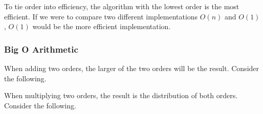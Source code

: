 To tie order into efficiency, the algorithm with the lowest order is the most efficient. If we were to compare two different implementations $O(n)$ and $O(1)$, $O(1)$ would be the more efficient implementation.\\

\subsubsection*{Big O Arithmetic}

When adding two orders, the larger of the two orders will be the result. Consider the following.\\


\clearpage
When multiplying two orders, the result is the distribution of both orders. Consider the following.\\


